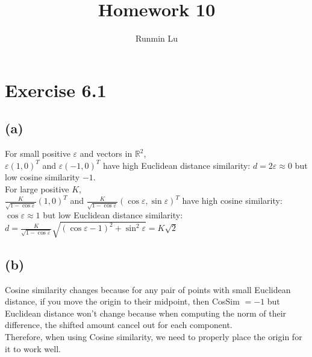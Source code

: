\documentclass{article}
\title{Homework 10}
\author{Runmin Lu}
\begin{document}
	\maketitle
	
	\section*{Exercise 6.1}
	\subsection*{(a)}
		For small positive $\varepsilon$ and vectors in $\mathbb R^2$,\\
		$\varepsilon(1, 0)^T$ and $\varepsilon(-1, 0)^T$ have high Euclidean distance similarity: $d = 2\varepsilon \approx 0$ but low cosine similarity $-1$.\\
		For large positive $K$,\\
		$\frac K{\sqrt{1 - \cos\varepsilon}}(1, 0)^T$ and $\frac K{\sqrt{1 - \cos\varepsilon}}(\cos\varepsilon, \sin\varepsilon)^T$ have high cosine similarity: $\cos \varepsilon \approx 1$ but low Euclidean distance similarity: $d = \frac K{\sqrt{1 - \cos\varepsilon}}\sqrt{(\cos\varepsilon-1)^2 + \sin^2\varepsilon} = K\sqrt 2$
			
	\subsection*{(b)}
		Cosine similarity changes because for any pair of points with small Euclidean distance, if you move the origin to their midpoint, then CosSim $= -1$ but Euclidean distance won't change because when computing the norm of their difference, the shifted amount cancel out for each component.\\
		Therefore, when using Cosine similarity, we need to properly place the origin for it to work well.
		
\end{document}
